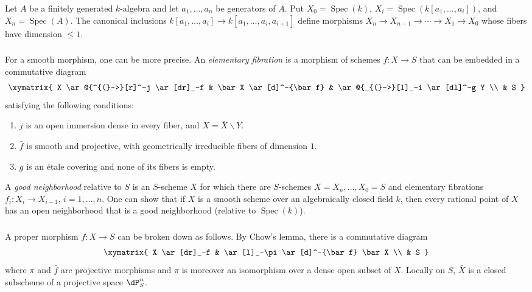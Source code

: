 \documentclass[12pt,oneside,english]{smfbook}
\DeclareMathOperator{\spec}{Spec}
\renewcommand{\setminus}{\smallsetminus}
\begin{document}
Let $A$ be a finitely generated $k$-algebra and let $a_1,\dotsc,a_n$ be generators of $A$. Put $X_0=\spec(k)$, $X_i=\spec(k[a_1,\dotsc,a_i])$, and $X_n=\spec(A)$. The canonical inclusions $k[a_1,\dotsc,a_i]\to k[a_1,\dotsc,a_i,a_{i+1}]$ define morphisms $X_n\to X_{n-1}\to\cdots\to X_1\to X_0$ whose fibers have dimension $\leqslant1$.

\subsubsection{}\label{I:3-4-2}

For a smooth morphism, one can be more precise. An \emph{elementary fibration} is a morphism of schemes $f:X\to S$ that can be embedded in a commutative diagram
\[\xymatrix{
  X \ar@{^{(}->}[r]^-j \ar[dr]_-f
    & \bar X \ar[d]^-{\bar f}
    & \ar@{_{(}->}[l]_-i \ar[dl]^-g Y \\
  & S
}\]
satisfying the following conditions:
\begin{enumerate}[\indent i)]
  \item $j$ is an open immersion dense in every fiber, and $X=\bar X\setminus Y$.
  \item $\bar f$ is smooth and projective, with geometrically irreducible fibers of dimension $1$.
  \item $g$ is an étale covering and none of its fibers is empty.
\end{enumerate}

A \emph{good neighborhood} relative to $S$ is an $S$-scheme $X$ for which there are $S$-schemes $X=X_n,\dotsc,X_0=S$ and elementary fibrations $f_i:X_i\to X_{i-1}$, $i=1,\dotsc,n$. One can show \cite[XI 3.3]{sga4} that if $X$ is a smooth scheme over an algebraically closed field $k$, then every rational point of $X$ has an open neighborhood that is a good neighborhood (relative to $\spec(k)$).

\subsubsection{}\label{I:3-4-3}

A proper morphism $f:X\to S$ can be broken down as follows. By Chow's lemma, there is a commutative diagram
\[\xymatrix{
  X \ar[dr]_-f
    & \ar[l]_-\pi \ar[d]^-{\bar f} \bar X \\
  & S
}\]
where $\pi$ and $\bar f$ are projective morphisms and $\pi$ is moreover an isomorphism over a dense open subset of $X$. Locally on $S$, $\bar X$ is a closed subscheme of a projective space $\dP_S^n$.
\end{document}
